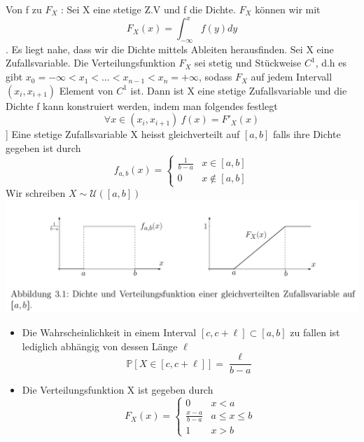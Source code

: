\Bem[3.25B] \newline
Von f zu \( F_X\) : Sei X eine stetige Z.V und f die Dichte. \(F_X\) können wir mit \[F_X(x) = \int_{-\infty}^x f(y)dy\]. Es liegt nahe, dass wir die Dichte mittels Ableiten herausfinden. \newline
\Theo[3.26] \newline
Sei X eine Zufallsvariable. Die Verteilungsfunktion \(F_X\) sei stetig und Stückweise \( C^1\), d.h es gibt \(x_0 = -\infty < x_1 < \dots < x_{n-1} < x_n = + \infty\), sodass \(F_X\) auf jedem Intervall \( (x_i, x_{i+1})\) Element von \(C^1\) ist. Dann ist X eine stetige Zufallsvariable und die Dichte f kann konstruiert werden, indem man folgendes festlegt \[ \forall x \in (x_i, x_{i+1}) \ f(x) = F'_X(x)\]
\Def[3.27 Gleichverteilung auf [a,b]] \newline
Eine stetige Zufallsvariable X heisst gleichverteilt auf \([a,b]\) falls ihre Dichte gegeben ist durch \[ f_{a,b}(x) = \begin{cases}
    \frac{1}{b-a} & x \in [a,b] \\
    0 & x \notin [a,b]
\end{cases}\]
Wir schreiben \(X \sim \mathcal{U}([a,b])\) \newline
\includegraphics[scale=0.1]{Gleichverteilt.png}
\Bem[3.27A]
\begin{itemize}
    \item Die Wahrscheinlichkeit in einem Interval \( [c, c + \ell] \subset [a,b]\) zu fallen ist lediglich abhängig von dessen Länge \( \ell\) \[\mathbb{P}[X \in [c, c + \ell ]] = \frac{\ell}{b-a}\]
    \item Die Verteilungsfunktion X ist gegeben durch \[ F_X(x) = \begin{cases}
        0 & x < a \\
        \frac{x-a}{b-a} & a \leq x \leq b \\
        1 & x > b
    \end{cases}\]
\end{itemize}
 \newline
